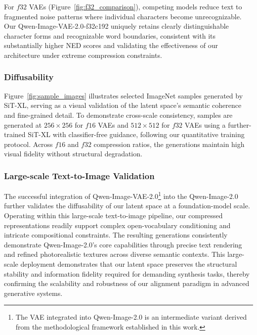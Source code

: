 \documentclass{llmxive}
\begin{document}
For $f32$ VAEs (Figure~\ref{fig:f32_comparison}), competing models reduce text to fragmented noise patterns where individual characters become unrecognizable. Our Qwen-Image-VAE-2.0-f32c192 uniquely retains clearly distinguishable character forms and recognizable word boundaries, consistent with its substantially higher NED scores and validating the effectiveness of our architecture under extreme compression constraints.



\subsubsection{Diffusability}
Figure~\ref{fig:sample_images} illustrates selected ImageNet samples generated by SiT-XL, serving as a visual validation of the latent space's semantic coherence and fine-grained detail. To demonstrate cross-scale consistency, samples are generated at $256\times256$ for $f16$ VAEs and $512\times512$ for $f32$ VAEs using a further-trained SiT-XL with classifier-free guidance, following our quantitative training protocol. Across $f16$ and $f32$ compression ratios, the generations maintain high visual fidelity without structural degradation.


\subsubsection{Large-scale Text-to-Image Validation}
The successful integration of Qwen-Image-VAE-2.0\footnote{The VAE integrated into Qwen-Image-2.0 is an intermediate variant derived from the methodological framework established in this work.} into the Qwen-Image-2.0~\citep{qwen-image-2.0} further validates the diffusability of our latent space at a foundation-model scale. Operating within this large-scale text-to-image pipeline, our compressed representations readily support complex open-vocabulary conditioning and intricate compositional constraints. The resulting generations consistently demonstrate Qwen-Image-2.0’s core capabilities through precise text rendering and refined photorealistic textures across diverse semantic contexts. This large-scale deployment demonstrates that our latent space preserves the structural stability and information fidelity required for demanding synthesis tasks, thereby confirming the scalability and robustness of our alignment paradigm in advanced generative systems.
\end{document}
